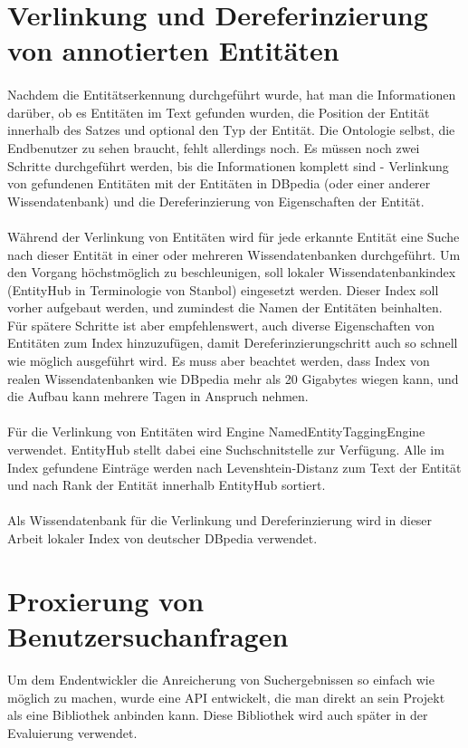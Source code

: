 \section{Verlinkung und Dereferinzierung von annotierten Entitäten}
\paragraph{}
Nachdem die Entitätserkennung durchgeführt wurde, hat man die Informationen darüber, ob es Entitäten im Text gefunden wurden, die Position der Entität innerhalb des Satzes und optional den Typ der Entität. Die Ontologie selbst, die Endbenutzer zu sehen braucht, fehlt allerdings noch. Es müssen noch zwei Schritte durchgeführt werden, bis die Informationen komplett sind - Verlinkung von gefundenen Entitäten mit der Entitäten in DBpedia (oder einer anderer Wissendatenbank) und die Dereferinzierung von Eigenschaften der Entität.

\paragraph{}  
Während der Verlinkung von Entitäten wird für jede erkannte Entität eine Suche nach dieser Entität in einer oder mehreren Wissendatenbanken durchgeführt. Um den Vorgang höchstmöglich zu beschleunigen, soll lokaler Wissendatenbankindex (EntityHub in Terminologie von Stanbol) eingesetzt werden. Dieser Index soll vorher aufgebaut werden, und zumindest die Namen der Entitäten beinhalten. Für spätere Schritte ist aber empfehlenswert, auch diverse Eigenschaften von Entitäten zum Index hinzuzufügen, damit Dereferinzierungschritt auch so schnell wie möglich ausgeführt wird. Es muss aber beachtet werden, dass Index von realen Wissendatenbanken wie DBpedia mehr als 20 Gigabytes wiegen kann, und die Aufbau kann mehrere Tagen in Anspruch nehmen.

\paragraph{}
Für die Verlinkung von Entitäten wird Engine NamedEntityTaggingEngine verwendet. EntityHub stellt dabei eine Suchschnitstelle zur Verfügung. Alle im Index gefundene Einträge werden nach Levenshtein-Distanz zum Text der Entität und nach Rank der Entität innerhalb EntityHub sortiert.


\paragraph{}
Als Wissendatenbank für die Verlinkung und Dereferinzierung wird in dieser Arbeit lokaler Index von deutscher DBpedia verwendet.

\section{Proxierung von Benutzersuchanfragen}
Um dem Endentwickler die Anreicherung von Suchergebnissen so einfach wie möglich zu machen, wurde eine API entwickelt, die man direkt an sein Projekt als eine Bibliothek anbinden kann. Diese Bibliothek wird auch später in der Evaluierung verwendet.